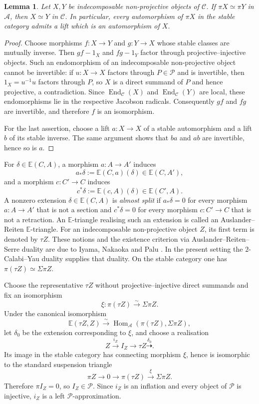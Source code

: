 \documentclass[11pt,reqno]{article}
\numberwithin{equation}{section}
\newtheorem{lemma}[lemma]{Lemma}
\theoremstyle{definition}
\DeclareMathOperator{\End}{End}
\DeclareMathOperator{\Hom}{Hom}
\newcommand{\C}{\mathcal C}
\newcommand{\A}{\mathcal A}
\newcommand{\Pcal}{\mathcal P}
\newcommand{\E}{\mathbb E}
\newcommand{\etri}{\dashrightarrow}
\begin{document}
\begin{lemma}\label{lem:stable-lift}
Let $X,Y$ be indecomposable non-projective objects of $\C$.  If $\pi X\simeq\pi Y$ in $\A$, then $X\simeq Y$ in $\C$.  In particular, every automorphism of $\pi X$ in the stable category admits a lift which is an automorphism of $X$.
\end{lemma}

\begin{proof}
Choose morphisms $f\colon X\to Y$ and $g\colon Y\to X$ whose stable classes are mutually inverse.  Then $gf-1_X$ and $fg-1_Y$ factor through projective--injective objects.  Such an endomorphism of an indecomposable non-projective object cannot be invertible: if $u\colon X\to X$ factors through $P\in\Pcal$ and is invertible, then $1_X=u^{-1}u$ factors through $P$, so $X$ is a direct summand of $P$ and hence projective, a contradiction.  Since $\End_{\C}(X)$ and $\End_{\C}(Y)$ are local, these endomorphisms lie in the respective Jacobson radicals.  Consequently $gf$ and $fg$ are invertible, and therefore $f$ is an isomorphism.

For the last assertion, choose a lift $a\colon X\to X$ of a stable automorphism and a lift $b$ of its stable inverse.  The same argument shows that $ba$ and $ab$ are invertible, hence so is $a$.
\end{proof}


For $\delta\in\E(C,A)$, a morphism $a\colon A\to A'$ induces
\[
 a_*\delta:=\E(C,a)(\delta)\in\E(C,A'),
\]
and a morphism $c\colon C'\to C$ induces
\[
 c^*\delta:=\E(c,A)(\delta)\in\E(C',A).
\]
A nonzero extension $\delta\in\E(C,A)$ is \emph{almost split} if
$a_*\delta=0$ for every morphism $a\colon A\to A'$ that is not a section and
$c^*\delta=0$ for every morphism $c\colon C'\to C$ that is not a retraction.  An
$\E$-triangle realising such an extension is called an Auslander--Reiten
$\E$-triangle.  For an indecomposable non-projective object $Z$, its first
term is denoted by $\tau Z$.  These notions and the existence criterion via
Auslander--Reiten--Serre duality are due to Iyama, Nakaoka and Palu \cite[Definition~3.1 and
Theorem~3.6]{IyamaNakaokaPalu}.  In the present setting the $2$-Calabi--Yau
duality supplies that duality.  On the stable category one has
$\pi(\tau Z)\simeq\Sigma\pi Z$.

Choose the representative $\tau Z$ without projective--injective direct summands and fix an isomorphism
\[
 \xi\colon\pi(\tau Z)\xrightarrow{\sim}\Sigma\pi Z.
\]
Under the canonical isomorphism
\[
 \E(\tau Z,Z)\xrightarrow{\sim}
 \Hom_{\A}(\pi(\tau Z),\Sigma\pi Z),
\]
let $\delta_0$ be the extension corresponding to $\xi$, and choose a realisation
\[
 Z\xrightarrow{i_Z}I_Z\longrightarrow\tau Z
 \overset{\delta_0}{\etri}.
\]
Its image in the stable category has connecting morphism $\xi$, hence is isomorphic to the standard suspension triangle
\[
 \pi Z\longrightarrow0\longrightarrow\pi(\tau Z)
       \xrightarrow{\xi}\Sigma\pi Z.
\]
Therefore $\pi I_Z=0$, so $I_Z\in\Pcal$.  Since $i_Z$ is an inflation and every object of $\Pcal$ is injective, $i_Z$ is a left $\Pcal$-approximation.
\end{document}
